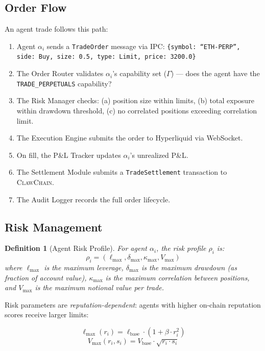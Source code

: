 \documentclass{article}
\newtheorem{definition}{Definition}
\newcommand{\clawchain}{\textsc{ClawChain}}
\begin{document}
\subsection{Order Flow}

An agent trade follows this path:

\begin{enumerate}[leftmargin=*]
    \item Agent $\alpha_i$ sends a \texttt{TradeOrder} message via IPC: \texttt{\{symbol: ``ETH-PERP'', side: Buy, size: 0.5, type: Limit, price: 3200.0\}}
    \item The Order Router validates $\alpha_i$'s capability set ($\Gamma$) — does the agent have the \texttt{TRADE\_PERPETUALS} capability?
    \item The Risk Manager checks: (a) position size within limits, (b) total exposure within drawdown threshold, (c) no correlated positions exceeding correlation limit.
    \item The Execution Engine submits the order to Hyperliquid via WebSocket.
    \item On fill, the P\&L Tracker updates $\alpha_i$'s unrealized P\&L.
    \item The Settlement Module submits a \texttt{TradeSettlement} transaction to \clawchain{}.
    \item The Audit Logger records the full order lifecycle.
\end{enumerate}

\subsection{Risk Management}

\begin{definition}[Agent Risk Profile]
For agent $\alpha_i$, the risk profile $\rho_i$ is:
$$\rho_i = (\ell_{\max}, \delta_{\max}, \kappa_{\max}, V_{\max})$$
where $\ell_{\max}$ is the maximum leverage, $\delta_{\max}$ is the maximum drawdown (as fraction of account value), $\kappa_{\max}$ is the maximum correlation between positions, and $V_{\max}$ is the maximum notional value per trade.
\end{definition}

Risk parameters are \emph{reputation-dependent}: agents with higher on-chain reputation scores receive larger limits:

$$\ell_{\max}(r_i) = \ell_{\text{base}} \cdot (1 + \beta \cdot r_i^2)$$
$$V_{\max}(r_i, s_i) = V_{\text{base}} \cdot \sqrt{r_i \cdot s_i}$$
\end{document}
